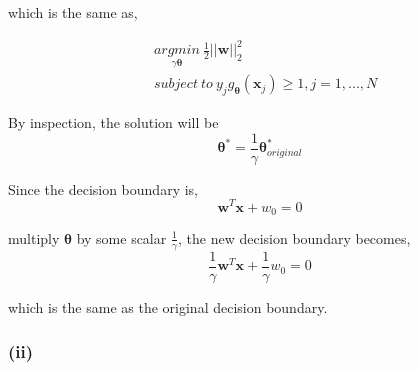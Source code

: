\documentclass[11pt]{article}
\begin{document}
which is the same as,

\begin{equation}
\begin{split}
&\underset{\gamma\pmb{\theta}}{argmin}\ \frac{1}{2}||\pmb{w}||^2_2 \\
&subject\ to\ y_jg_{\pmb{\theta}}(\pmb{x}_j)\ge 1,j=1,...,N
\end{split}
\end{equation}

By inspection, the solution will be 
$$\pmb{\theta}^* = \frac{1}{\gamma}\pmb{\theta}^*_{original}$$

Since the decision boundary is,
$$\pmb{w}^T\pmb{x} + w_0=0$$

multiply $\pmb{\theta}$ by some scalar $\frac{1}{\gamma}$, the new decision boundary becomes,
$$\frac{1}{\gamma}\pmb{w}^T\pmb{x} + \frac{1}{\gamma} w_0 = 0$$

which is the same as the original decision boundary.

\subsubsection*{(ii)}
\end{document}
